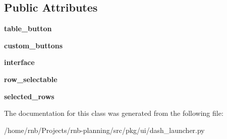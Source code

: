 \subsection*{Public Attributes}
\begin{DoxyCompactItemize}
\item 
\mbox{\label{classrnb-planning_1_1src_1_1pkg_1_1ui_1_1dash__launcher_1_1_table_info_a8c8c11cb802d95491d8baa2d7f4e2dca}} 
{\bfseries table\+\_\+button}
\item 
\mbox{\label{classrnb-planning_1_1src_1_1pkg_1_1ui_1_1dash__launcher_1_1_table_info_a407b9d6f2a298a447c3a445e23050c5c}} 
{\bfseries custom\+\_\+buttons}
\item 
\mbox{\label{classrnb-planning_1_1src_1_1pkg_1_1ui_1_1dash__launcher_1_1_table_info_ade79a581140730c37a2bf648f6f24a14}} 
{\bfseries interface}
\item 
\mbox{\label{classrnb-planning_1_1src_1_1pkg_1_1ui_1_1dash__launcher_1_1_table_info_ac4e8788f6a880c10ea5259f5668b8766}} 
{\bfseries row\+\_\+selectable}
\item 
\mbox{\label{classrnb-planning_1_1src_1_1pkg_1_1ui_1_1dash__launcher_1_1_table_info_ad3dda2199b371f397331fd01f00acfd2}} 
{\bfseries selected\+\_\+rows}
\end{DoxyCompactItemize}


The documentation for this class was generated from the following file\+:\begin{DoxyCompactItemize}
\item 
/home/rnb/\+Projects/rnb-\/planning/src/pkg/ui/dash\+\_\+launcher.\+py\end{DoxyCompactItemize}
